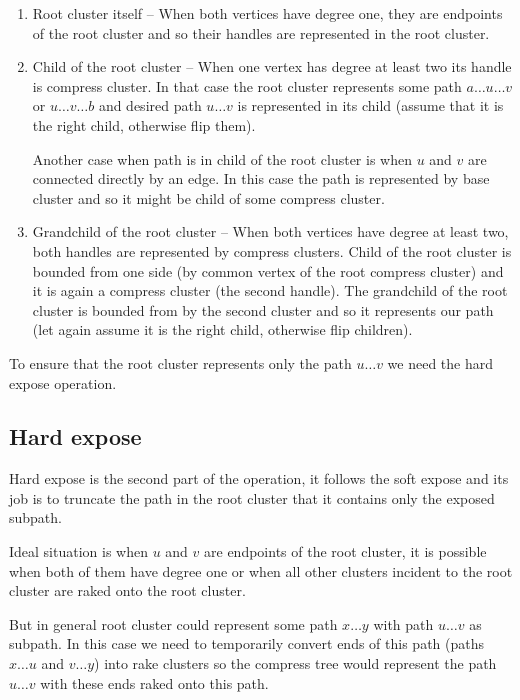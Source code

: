 \begin{enumerate}

\item Root cluster itself -- When both vertices have degree one, they are endpoints
of the root cluster and so their handles are represented in the root cluster.

\item Child of the root cluster -- When one vertex has degree at least two its
handle is compress cluster. In that case the root cluster represents some path
$a\dots u\dots v$ or $u\dots v\dots b$ and desired path $u\dots v$ is
represented in its child (assume that it is the right child, otherwise flip them).

Another case when path is in child of the root cluster is when $u$ and $v$ are
connected directly by an edge. In this case the path is represented by base cluster
and so it might be child of some compress cluster.

\item Grandchild of the root cluster -- When both vertices have degree at least
two, both handles are represented by compress clusters. Child of the root cluster
is bounded from one side (by common vertex of the root compress cluster) and it
is again a compress cluster (the second handle).
The grandchild of the root cluster is bounded from by the second cluster and so
it represents our path (let again assume it is the right child, otherwise flip
children).

\end{enumerate}

To ensure that the root cluster represents only the path $u\dots v$ we need the
hard expose operation.

\subsection{Hard expose}

Hard expose is the second part of the \Expose{} operation, it follows the soft
expose and its job is to truncate the path in the root cluster that it contains
only the exposed subpath.

Ideal situation is when $u$ and $v$ are endpoints of the root cluster, it is
possible when both of them have degree one or when all other clusters incident
to the root cluster are raked onto the root cluster.

But in general root cluster could represent some path $x\dots y$ with path $u\dots v$
as subpath. In this case we need to temporarily convert ends of this path (paths
$x\dots u$ and $v\dots y$) into rake clusters so the compress tree would represent the
path $u\dots v$ with these ends raked onto this path.


